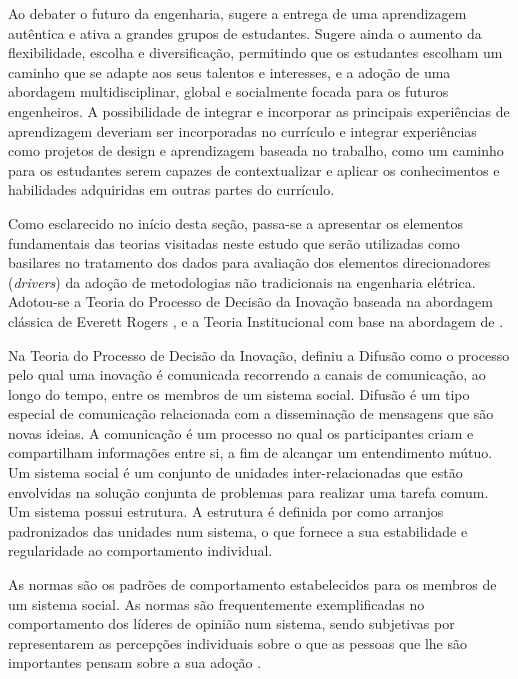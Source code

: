 \documentclass{textolivre-html}
\begin{document}
Ao debater o futuro da engenharia, \textcite{graham2018} sugere a entrega de uma aprendizagem autêntica e ativa a grandes grupos de estudantes. Sugere ainda o aumento da flexibilidade, escolha e diversificação, permitindo que os estudantes escolham um caminho que se adapte aos seus talentos e interesses, e a adoção de uma abordagem multidisciplinar, global e socialmente focada para os futuros engenheiros. A possibilidade de integrar e incorporar as principais experiências de aprendizagem deveriam ser incorporadas no currículo e integrar experiências como projetos de design e aprendizagem baseada no trabalho, como um caminho para os estudantes serem capazes de contextualizar e aplicar os conhecimentos e habilidades adquiridas em outras partes do currículo.

Como esclarecido no início desta seção, passa-se a apresentar os elementos fundamentais das teorias visitadas neste estudo que serão utilizadas como basilares no tratamento dos dados para avaliação dos elementos direcionadores (\textit{drivers}) da adoção de metodologias não tradicionais na engenharia elétrica. Adotou-se a Teoria do Processo de Decisão da Inovação baseada na abordagem clássica de Everett Rogers \cite{rogers1983}, e a Teoria Institucional com base na abordagem de \textcite{meyer1977}.

Na Teoria do Processo de Decisão da Inovação, \textcite{rogers1983} definiu a Difusão como o processo pelo qual uma inovação é comunicada recorrendo a canais de comunicação, ao longo do tempo, entre os membros de um sistema social. Difusão é um tipo especial de comunicação relacionada com a disseminação de mensagens que são novas ideias. A comunicação é um processo no qual os participantes criam e compartilham informações entre si, a fim de alcançar um entendimento mútuo. Um sistema social é um conjunto de unidades inter-relacionadas que estão envolvidas na solução conjunta de problemas para realizar uma tarefa comum. Um sistema possui estrutura. A estrutura é definida por \textcite{rogers1983} como arranjos padronizados das unidades num sistema, o que fornece a sua estabilidade e regularidade ao comportamento individual.

As normas são os padrões de comportamento estabelecidos para os membros de um sistema social. As normas são frequentemente exemplificadas no comportamento dos líderes de opinião num sistema, sendo subjetivas por representarem as percepções individuais sobre o que as pessoas que lhe são importantes pensam sobre a sua adoção \cite{hill1977}.
\end{document}
